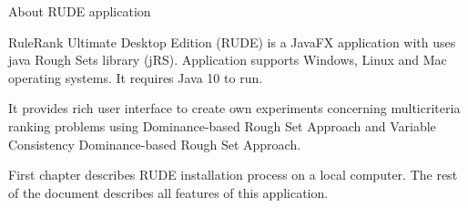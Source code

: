 \begin{Large}
	About RUDE application
\end{Large}
\newline

RuleRank Ultimate Desktop Edition (RUDE) is a JavaFX application with uses java Rough Sets library (jRS). Application supports Windows, Linux and Mac operating systems. It requires Java 10 to run.
\newline

It provides rich user interface to create own experiments concerning multicriteria ranking problems using Dominance-based Rough Set Approach and Variable Consistency Dominance-based Rough Set Approach.
\newline

First chapter describes RUDE installation process on a local computer. The rest of the document describes all features of this application.

\vfill\newpage
